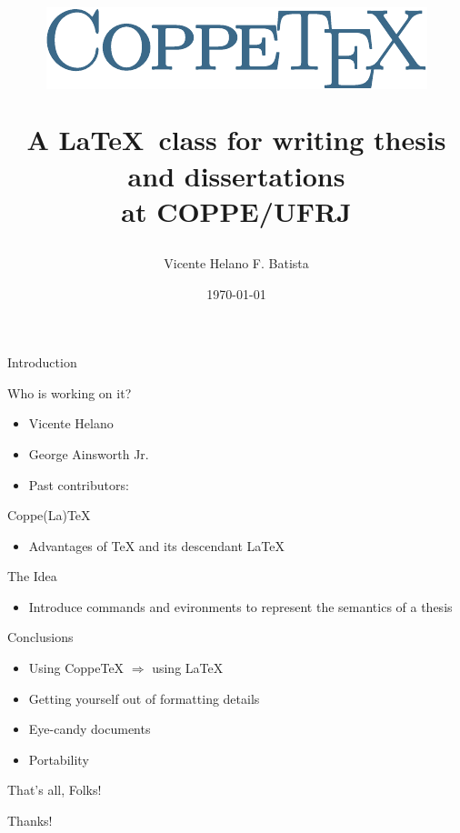 \documentclass[style=coppe,mode=present,paper=a4paper]{powerdot}
\title{%
\begin{center}
\includegraphics[scale=0.5]{images/logo}
\end{center}
\begin{center}
\normalsize\fontfamily{cmr}%
A \LaTeX\ class for writing thesis and dissertations\\
at COPPE/UFRJ
\end{center}}
\author{Vicente Helano F. Batista}
\date{\today}
\begin{document}
\maketitle

\begin{slide}{Introduction}
\vspace*{1cm}

\end{slide}

\begin{slide}{Who is working on it?}
\vspace*{1cm}

\begin{itemize}
\item Vicente Helano
\item George Ainsworth Jr.\pause
\item Past contributors:
\end{itemize}

\end{slide}

\begin{slide}{Coppe(La)TeX}
\vspace*{1cm}

\begin{itemize}
\item Advantages of TeX and its descendant LaTeX
\end{itemize}

\end{slide}

\begin{slide}{The Idea}
\vspace*{1cm}

\begin{itemize}
\item Introduce commands and evironments to represent the semantics of a thesis
\end{itemize}

\end{slide}


\begin{slide}{Conclusions}
\vspace*{1cm}

\begin{itemize}
\item Using CoppeTeX $\Rightarrow$ using LaTeX
\item Getting yourself out of formatting details
\item Eye-candy documents
\item Portability
\end{itemize}

\end{slide}


\begin{slide}{That's all, Folks!}
\vspace*{\fill}
\begin{center}
\Huge Thanks!
\end{center}
\vspace*{\fill}
\end{slide}
\end{document}
